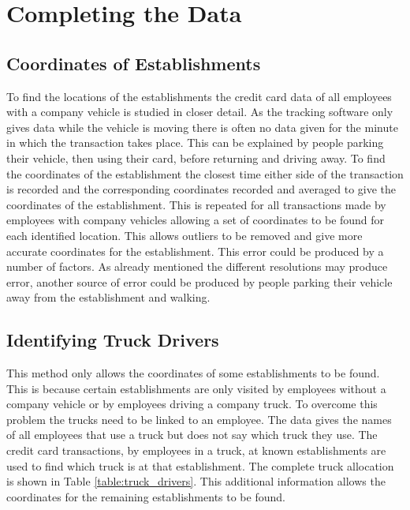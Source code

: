 \section{Completing the Data}
\label{sec:completedata}
\subsection{Coordinates of Establishments}
\label{sec:completeloc}

\noindent To find the locations of the establishments the credit card data of all employees with a company vehicle is studied in closer detail. As the tracking software only gives data while the vehicle is moving there is often no data given for the minute in which the transaction takes place. This can be explained by people parking their vehicle, then using their card, before returning and driving away.  To find the coordinates of the establishment the closest time either side of the transaction is recorded and the corresponding coordinates recorded and averaged to give the coordinates of the establishment. This is repeated for all transactions made by employees with company vehicles allowing a set of coordinates to be found for each identified location. This allows outliers to be removed and give more accurate coordinates for the establishment. This error could be produced by a number of factors. As already mentioned the different resolutions may produce error, another source of error could be produced by people parking their vehicle away from the establishment and walking. 
 
 \subsection{Identifying Truck Drivers}
 
This method only allows the coordinates of some establishments to be found. This is because certain establishments are only visited by employees without a company vehicle or by employees driving a company truck. To overcome this problem the trucks need to be linked to an employee. The data gives the names of all employees that use a truck but does not say which truck they use.
The credit card transactions, by employees in a truck, at known establishments are used to find which truck is at that establishment.
The complete truck allocation is shown in Table \ref{table:truck_drivers}. This additional information allows the coordinates for the remaining establishments to be found.

